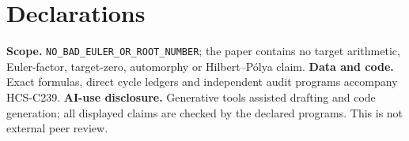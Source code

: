\documentclass[10pt]{article}
\begin{document}
\section*{Declarations}
\textbf{Scope.} \nolinkurl{NO_BAD_EULER_OR_ROOT_NUMBER}; the paper contains no
target arithmetic, Euler-factor, target-zero, automorphy or Hilbert--Pólya
claim.  \textbf{Data and code.} Exact formulas, direct cycle ledgers and
independent audit programs accompany HCS-C239.  \textbf{AI-use disclosure.}
Generative tools assisted drafting and code generation; all displayed claims
are checked by the declared programs.  This is not external peer review.
\end{document}
